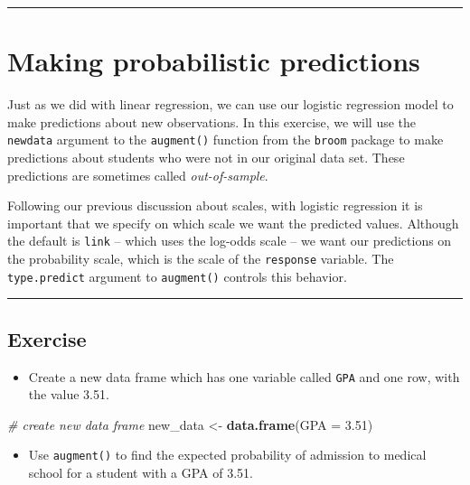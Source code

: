 \documentclass[]{book}
\newenvironment{Shaded}{\begin{snugshade}}{\end{snugshade}}
\newcommand{\KeywordTok}[1]{\textcolor[rgb]{0.13,0.29,0.53}{\textbf{#1}}}
\newcommand{\DataTypeTok}[1]{\textcolor[rgb]{0.13,0.29,0.53}{#1}}
\newcommand{\FloatTok}[1]{\textcolor[rgb]{0.00,0.00,0.81}{#1}}
\newcommand{\StringTok}[1]{\textcolor[rgb]{0.31,0.60,0.02}{#1}}
\newcommand{\CommentTok}[1]{\textcolor[rgb]{0.56,0.35,0.01}{\textit{#1}}}
\newcommand{\NormalTok}[1]{#1}
\providecommand{\tightlist}{%
  \setlength{\itemsep}{0pt}\setlength{\parskip}{0pt}}
\begin{document}
\begin{center}\rule{0.5\linewidth}{\linethickness}\end{center}

\section{Making probabilistic
predictions}\label{making-probabilistic-predictions}

Just as we did with linear regression, we can use our logistic
regression model to make predictions about new observations. In this
exercise, we will use the \texttt{newdata} argument to the
\texttt{augment()} function from the \texttt{broom} package to make
predictions about students who were not in our original data set. These
predictions are sometimes called \emph{out-of-sample}.

Following our previous discussion about scales, with logistic regression
it is important that we specify on which scale we want the predicted
values. Although the default is \texttt{link} -- which uses the log-odds
scale -- we want our predictions on the probability scale, which is the
scale of the \texttt{response} variable. The \texttt{type.predict}
argument to \texttt{augment()} controls this behavior.

\begin{center}\rule{0.5\linewidth}{\linethickness}\end{center}

\subsection*{Exercise}\label{exercise-19}

\begin{itemize}
\tightlist
\item
  Create a new data frame which has one variable called \texttt{GPA} and
  one row, with the value 3.51.
\end{itemize}

\begin{Shaded}
\begin{Highlighting}[]
\CommentTok{# create new data frame}
\NormalTok{new_data <-}\StringTok{ }\KeywordTok{data.frame}\NormalTok{(}\DataTypeTok{GPA =} \FloatTok{3.51}\NormalTok{)}
\end{Highlighting}
\end{Shaded}

\begin{itemize}
\tightlist
\item
  Use \texttt{augment()} to find the expected probability of admission
  to medical school for a student with a GPA of 3.51.
\end{itemize}
\end{document}
